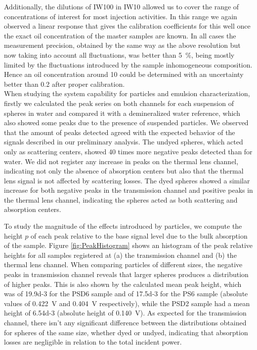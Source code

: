 \documentclass[9pt,twocolumn,twoside]{osajnl}
\begin{document}
Additionally, the dilutions of IW100 in IW10 allowed us to cover the range of concentrations of interest for most injection activities. In this range we again observed a linear response that gives the calibration coefficients for this well once the exact oil concentration of the master samples are known. In all cases the measurement precision, obtained by the same way as the above resolution but now taking into account all fluctuations, was better than \SI{5}{\percent}, being mostly limited by the fluctuations introduced by the sample inhomogeneous composition. Hence an oil concentration around \SI{10}{\ppm} could be determined with an uncertainty better than \SI{0.2}{\ppm} after proper calibration. \\

When studying the system capability for particles and emulsion characterization, firstly we calculated the peak series on both channels for each suspension of spheres in water and compared it with a demineralized water reference, which also showed some peaks due to the presence of suspended particles. We observed that the amount of peaks detected agreed with the expected behavior of the signals described in our preliminary analysis. The undyed spheres, which acted only as scattering centers, showed \SI{40}{} times more negative peaks detected than for water. We did not register any increase in peaks on the thermal lens channel, indicating not only the absence of absorption centers but also that the thermal lens signal is not affected by scattering losses. The dyed spheres showed a similar increase for both negative peaks in the transmission channel and positive peaks in the thermal lens channel, indicating the spheres acted as both scattering and absorption centers.

To study the magnitude of the effects introduced by particles, we compute the height $p$ of each peak relative to the base signal level due to the bulk absorption of the sample. Figure \ref{fig:PeakHistogram} shows an histogram of the peak relative heights for all samples registered at (a) the transmission channel and (b) the thermal lens channel. When comparing particles of different sizes, the negative peaks in transmission channel reveals that larger spheres produces a distribution of higher peaks. This is also shown by the calculated mean peak height, which was of \SI{19.9d-3}{} for the PSD6 sample and of \SI{17.5d-3}{} for the PS6 sample (absolute values of \SI{0.422}{\volt} and \SI{0.404}{\volt} respectively), while the PSD2 sample had a mean height of \SI{6.54d-3}{} (absolute height of \SI{0.140}{\volt}). As expected for the transmission channel, there isn't any significant difference between the distributions obtained for spheres of the same size, whether dyed or undyed, indicating that absorption losses are negligible in relation to the total incident power.
\end{document}

